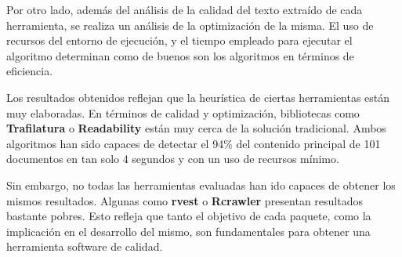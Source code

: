 Por otro lado, además del análisis de la calidad del texto extraído de cada herramienta, se realiza un
análisis de la optimización de la misma. El uso de recursos del entorno de ejecución, y el tiempo empleado
para ejecutar el algoritmo determinan como de buenos son los algoritmos en términos de eficiencia.

Los resultados obtenidos reflejan que la heurística de ciertas herramientas están muy elaboradas. En
términos de calidad y optimización, bibliotecas como \textbf{Trafilatura} o \textbf{Readability} están muy
cerca de la solución tradicional. Ambos algoritmos han sido capaces de detectar el 94\% del contenido
principal de 101 documentos en tan solo 4 segundos y con un uso de recursos mínimo.

Sin embargo, no todas las herramientas evaluadas han ido capaces de obtener los mismos resultados. Algunas
como \textbf{rvest} o \textbf{Rcrawler} presentan resultados bastante pobres. Esto refleja que tanto el
objetivo de cada paquete, como la implicación en el desarrollo del mismo, son fundamentales para obtener
una herramienta software de calidad.

